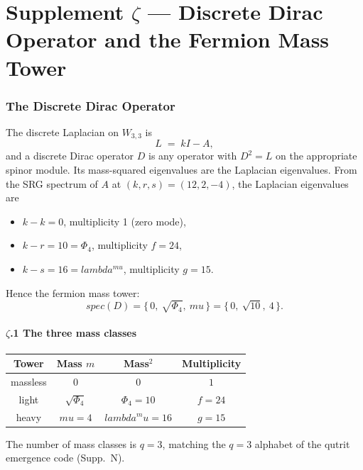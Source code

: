 \documentclass[12pt,a4paper]{article}
\def\mathrm#1{#1}%
\def\lambda{lambda}%
\def\mu{mu}%
\def\Phi#1{Phi#1}%
\theoremstyle{definition}
\begin{document}
\part*{\texorpdfstring{Supplement $\zeta$ --- Discrete Dirac Operator and the Fermion Mass Tower}{Supplement zeta --- Discrete Dirac Operator and the Fermion Mass Tower}}

\section*{The Discrete Dirac Operator}

The discrete Laplacian on $W_{3,3}$ is
\[
L \;=\; kI - A,
\]
and a discrete Dirac operator $D$ is any operator with $D^2 = L$ on
the appropriate spinor module. Its mass-squared eigenvalues are the
Laplacian eigenvalues. From the SRG spectrum of $A$ at
$(k, r, s) = (12, 2, -4)$, the Laplacian eigenvalues are
\begin{itemize}[leftmargin=2em,nosep]
\item $k - k = 0$, multiplicity 1 (zero mode),
\item $k - r = 10 = \Phi_4$, multiplicity $f = 24$,
\item $k - s = 16 = \lambda^{\mu}$, multiplicity $g = 15$.
\end{itemize}
Hence the fermion mass tower:
\[
\boxed{\;\mathrm{spec}(D) = \{\,0,\ \sqrt{\Phi_4},\ \mu\,\} = \{\,0,\ \sqrt{10},\ 4\,\}.\;}
\]

\subsection*{$\zeta$.1 \quad The three mass classes}
\begin{center}
\renewcommand{\arraystretch}{1.4}
\begin{tabular}{cccc}
\toprule
Tower & Mass $m$ & Mass$^2$ & Multiplicity \\
\midrule
massless & $0$ & $0$ & $1$ \\
light    & $\sqrt{\Phi_4}$ & $\Phi_4 = 10$ & $f = 24$ \\
heavy    & $\mu = 4$ & $\lambda^\mu = 16$ & $g = 15$ \\
\bottomrule
\end{tabular}
\end{center}

The number of mass classes is $q = 3$, matching the $q=3$ alphabet
of the qutrit emergence code (Supp.~N).
\end{document}
